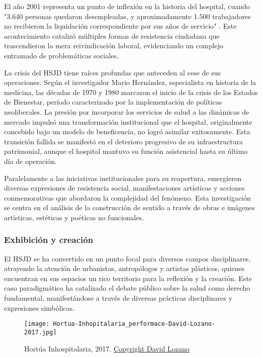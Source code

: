 El año 2001 representa un punto de inflexión en la historia del hospital, cuando "3.640 personas quedaron desempleadas, y aproximadamente 1.500 trabajadores no recibieron la liquidación correspondiente por sus años de servicio" \parencite{Castiblanco2017}. Este acontecimiento catalizó múltiples formas de resistencia ciudadana que trascendieron la mera reivindicación laboral, evidenciando un complejo entramado de problemáticas sociales.

La crisis del HSJD tiene raíces profundas que anteceden al cese de sus operaciones. Según el investigador Mario Hernández, especialista en historia de la medicina, las décadas de 1970 y 1980 marcaron el inicio de la crisis de los Estados de Bienestar, período caracterizado por la implementación de políticas neoliberales. La presión por incorporar los servicios de salud a las dinámicas de mercado impulsó una transformación institucional que el hospital, originalmente concebido bajo un modelo de beneficencia, no logró asimilar exitosamente. Esta transición fallida se manifestó en el deterioro progresivo de su infraestructura patrimonial, aunque el hospital mantuvo su función asistencial hasta su último día de operación.

Paralelamente a las iniciativas institucionales para su reapertura, emergieron diversas expresiones de resistencia social, manifestaciones artísticas y acciones conmemorativas que abordaron la complejidad del fenómeno. Esta investigación se centra en el análisis de la construcción de sentido a través de obras e imágenes artísticas, estéticas y poéticas no funcionales.

\subsubsection*{Exhibición y creación}

El HSJD se ha convertido en un punto focal para diversos campos disciplinares, atrayendo la atención de urbanistas, antropólogos y artistas plásticos, quienes encuentran en sus espacios un rico territorio para la reflexión y la creación. Este caso paradigmático ha catalizado el debate público sobre la salud como derecho fundamental, manifestándose a través de diversas prácticas disciplinares y expresiones simbólicas.

\begin{figure}[h!]
    \centering
    \texttt{[image: Hortua-Inhopitalaria\_performace-David-Lozano-2017.jpg]}
    \caption{Hortúa Inhospitalaria, 2017. \href{https://david-lozano.org/work/hortua-inhospitalaria}{Copyright David Lozano}}
    \label{fig:david_lozano_hortua}
\end{figure}


